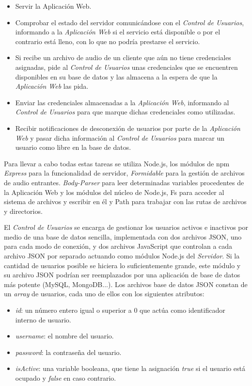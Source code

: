 \begin{itemize}
\item Servir la Aplicación Web.
\item Comprobar el estado del servidor comunicándose con el \emph{Control de Usuarios}, informando a la \emph{Aplicación Web} si el servicio está disponible o por el contrario está lleno, con lo que no podría prestarse el servicio.
\item Si recibe un archivo de audio de un cliente que aún no tiene credenciales asignadas, pide al \emph{Control de Usuarios} unas credenciales que se encuentren disponibles en su base de datos y las almacena a la espera de que la \emph{Aplicación Web} las pida.
\item Enviar las credenciales almacenadas a la \emph{Aplicación Web}, informando al \emph{Control de Usuarios} para que marque dichas credenciales como utilizadas.
\item Recibir notificaciones de desconexión de usuarios por parte de la \emph{Aplicación Web} y pasar dicha información al \emph{Control de Usuarios} para marcar un usuario como libre en la base de datos.
\end{itemize}

Para llevar a cabo todas estas tareas se utiliza Node.js, los módulos de npm \emph{Express} para la funcionalidad de servidor, \emph{Formidable} para la gestión de archivos de audio entrantes. \emph{Body-Parser} para leer determinadas variables procedentes de la Aplicación Web y los módulos del núcleo de Node.js, Fs para acceder al sistema de archivos y escribir en él y Path para trabajar con las rutas de archivos y directorios.

El \emph{Control de Usuarios} se encarga de gestionar los usuarios activos e inactivos por medio de una base de datos sencilla, implementada con dos archivos JSON, uno para cada modo de conexión, y dos archivos JavaScript que controlan a cada archivo JSON por separado actuando como módulos Node.js del \emph{Servidor}. Si la cantidad de usuarios posible se hiciera lo suficientemente grande, este módulo y su archivo JSON podrían ser reemplazados por una aplicación de base de datos más potente (MySQL, MongoDB...). Los archivos base de datos JSON constan de un \emph{array} de usuarios, cada uno de ellos con los siguientes atributos:

\begin{itemize}
\item \emph{id}: un número entero igual o superior a 0 que actúa como identificador interno de usuario.
\item \emph{username}: el nombre del usuario.
\item \emph{password}: la contraseña del usuario.
\item \emph{isActive}: una variable booleana, que tiene la asignación \emph{true} si el usuario está ocupado y \emph{false} en caso contrario.
\end{itemize}

